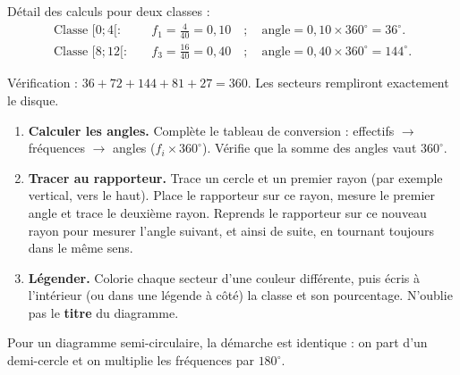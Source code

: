 \documentclass[11pt]{article}
\begin{document}
Détail des calculs pour deux classes :
\begin{align*}
\text{Classe } [0;4[ : \quad & f_1 = \frac{4}{40} = 0{,}10 \quad ; \quad \text{angle} = 0{,}10 \times 360^\circ = 36^\circ. \\
\text{Classe } [8;12[ : \quad & f_3 = \frac{16}{40} = 0{,}40 \quad ; \quad \text{angle} = 0{,}40 \times 360^\circ = 144^\circ.
\end{align*}

Vérification : $36 + 72 + 144 + 81 + 27 = 360$. Les secteurs rempliront exactement le disque.

\begin{methode}
\begin{enumerate}
\item \textbf{Calculer les angles.} Complète le tableau de conversion : effectifs $\rightarrow$ fréquences $\rightarrow$ angles ($f_i \times 360^\circ$). Vérifie que la somme des angles vaut $360^\circ$.
\item \textbf{Tracer au rapporteur.} Trace un cercle et un premier rayon (par exemple vertical, vers le haut). Place le rapporteur sur ce rayon, mesure le premier angle et trace le deuxième rayon. Reprends le rapporteur sur ce nouveau rayon pour mesurer l'angle suivant, et ainsi de suite, en tournant toujours dans le même sens.
\item \textbf{Légender.} Colorie chaque secteur d'une couleur différente, puis écris à l'intérieur (ou dans une légende à côté) la classe et son pourcentage. N'oublie pas le \textbf{titre} du diagramme.
\end{enumerate}
Pour un diagramme semi-circulaire, la démarche est identique : on part d'un demi-cercle et on multiplie les fréquences par $180^\circ$.
\end{methode}
\end{document}
